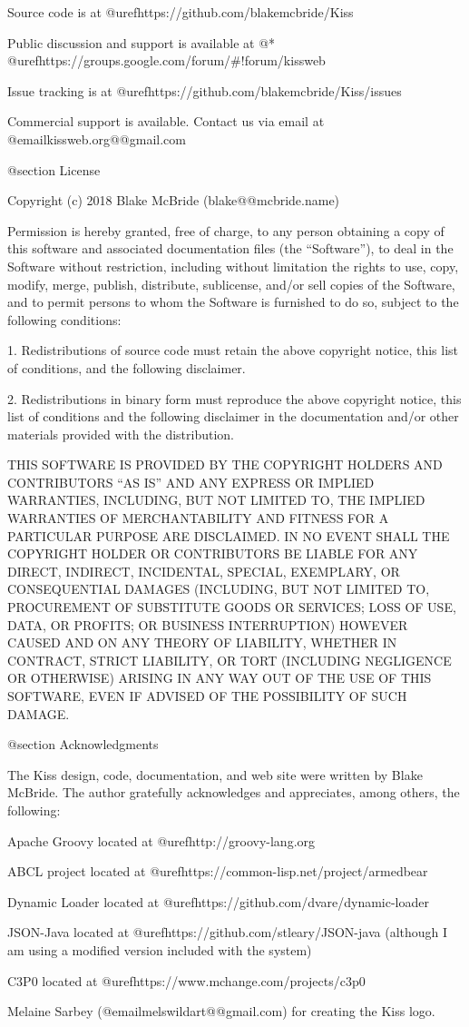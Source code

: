 Source code is at @uref{https://github.com/blakemcbride/Kiss}

Public discussion and support is available at @* @uref{https://groups.google.com/forum/#!forum/kissweb}

Issue tracking is at @uref{https://github.com/blakemcbride/Kiss/issues}

Commercial support is available.  Contact us via email at @email{kissweb.org@@gmail.com}

@section License

Copyright (c) 2018 Blake McBride (blake@@mcbride.name)

Permission is hereby granted, free of charge, to any person obtaining
a copy of this software and associated documentation files (the
``Software''), to deal in the Software without restriction, including
without limitation the rights to use, copy, modify, merge, publish,
distribute, sublicense, and/or sell copies of the Software, and to
permit persons to whom the Software is furnished to do so, subject to
the following conditions:

1. Redistributions of source code must retain the above copyright
notice, this list of conditions, and the following disclaimer.

2. Redistributions in binary form must reproduce the above copyright
notice, this list of conditions and the following disclaimer in the
documentation and/or other materials provided with the distribution.

THIS SOFTWARE IS PROVIDED BY THE COPYRIGHT HOLDERS AND CONTRIBUTORS
``AS IS'' AND ANY EXPRESS OR IMPLIED WARRANTIES, INCLUDING, BUT NOT
LIMITED TO, THE IMPLIED WARRANTIES OF MERCHANTABILITY AND FITNESS FOR
A PARTICULAR PURPOSE ARE DISCLAIMED. IN NO EVENT SHALL THE COPYRIGHT
HOLDER OR CONTRIBUTORS BE LIABLE FOR ANY DIRECT, INDIRECT, INCIDENTAL,
SPECIAL, EXEMPLARY, OR CONSEQUENTIAL DAMAGES (INCLUDING, BUT NOT
LIMITED TO, PROCUREMENT OF SUBSTITUTE GOODS OR SERVICES; LOSS OF USE,
DATA, OR PROFITS; OR BUSINESS INTERRUPTION) HOWEVER CAUSED AND ON ANY
THEORY OF LIABILITY, WHETHER IN CONTRACT, STRICT LIABILITY, OR TORT
(INCLUDING NEGLIGENCE OR OTHERWISE) ARISING IN ANY WAY OUT OF THE USE
OF THIS SOFTWARE, EVEN IF ADVISED OF THE POSSIBILITY OF SUCH DAMAGE.

@section Acknowledgments

The Kiss design, code, documentation, and web site were written by Blake
McBride.  The author gratefully acknowledges and appreciates, among others, the following:


Apache Groovy located at @uref{http://groovy-lang.org}

ABCL project located at @uref{https://common-lisp.net/project/armedbear}

Dynamic Loader located at @uref{https://github.com/dvare/dynamic-loader}

JSON-Java located at @uref{https://github.com/stleary/JSON-java} (although
I am using a modified version included with the system)

C3P0 located at @uref{https://www.mchange.com/projects/c3p0}

Melaine Sarbey (@email{melswildart@@gmail.com}) for creating the Kiss logo.

